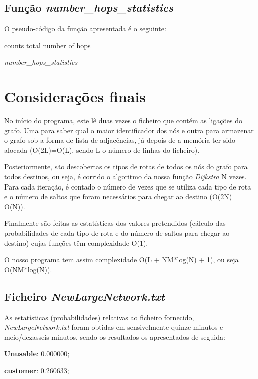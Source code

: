 \documentclass[a4paper]{article}
\begin{document}
\subsection{Função \textit{number\_hops\_statistics}}
O pseudo-código da função apresentada é o seguinte:

\begin{algorithm}[H]
 counts total number of hops\;
 
 
 \caption{\textit{number\_hops\_statistics}}
\end{algorithm}

\section{Considerações finais}
No início do programa, este lê duas vezes o ficheiro que contém as ligações do grafo. Uma para saber qual o maior identificador dos nós e outra para armazenar o grafo sob a forma de lista de adjacências, já depois de a memória ter sido alocada (O(2L)=O(L), sendo L o número de linhas do ficheiro).

Posteriormente, são descobertas os tipos de rotas de todos os nós do grafo para todos destinos, ou seja, é corrido o algoritmo da nossa função \textit{Dijkstra} N vezes. Para cada iteração, é contado o número de vezes que se utiliza cada tipo de rota e o número de saltos que foram necessários para chegar ao destino (O(2N) = O(N)).

Finalmente são feitas as estatísticas dos valores pretendidos (cálculo das probabilidades de cada tipo de rota e do número de saltos para chegar ao destino) cujas funções têm complexidade O(1).

O nosso programa tem assim complexidade O(L + NM*log(N) + 1), ou seja O(NM*log(N)).

\subsection{Ficheiro \textit{NewLargeNetwork.txt}}
As estatísticas (probabilidades) relativas ao ficheiro fornecido, \textit{NewLargeNetwork.txt} foram obtidas em sensivelmente quinze minutos e meio/dezasseis minutos, sendo os resultados os apresentados de seguida:

\textbf{Unusable}: 0.000000;

\textbf{customer}: 0.260633;
\end{document}
